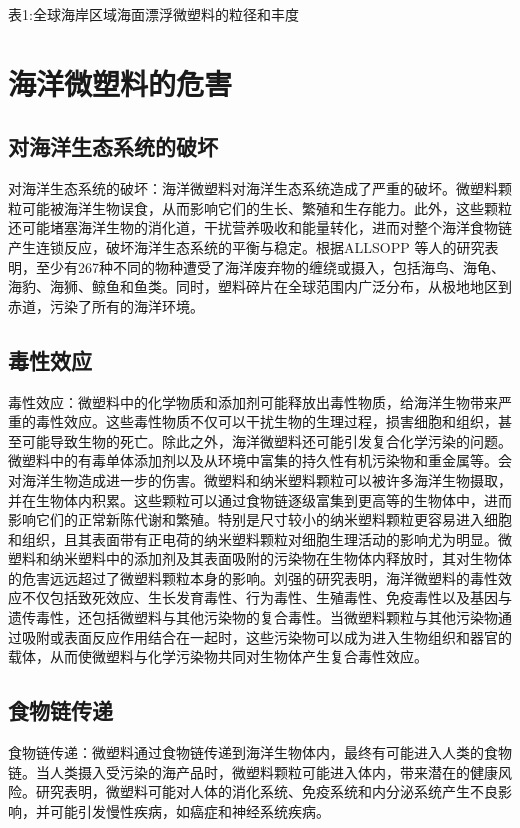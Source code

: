 \documentclass{article}
\begin{document}
      \begin{center}
          表1:\quad 全球海岸区域海面漂浮微塑料的粒径和丰度\cite{03}
      \end{center}  
      
        
    \section{海洋微塑料的危害}
    
    \subsection{对海洋生态系统的破坏}对海洋生态系统的破坏：海洋微塑料对海洋生态系统造成了严重的破坏。微塑料颗粒可能被海洋生物误食，从而影响它们的生长、繁殖和生存能力。此外，这些颗粒还可能堵塞海洋生物的消化道，干扰营养吸收和能量转化，进而对整个海洋食物链产生连锁反应，破坏海洋生态系统的平衡与稳定。根据ALLSOPP \cite{04}等人的研究表明，至少有267种不同的物种遭受了海洋废弃物的缠绕或摄入，包括海鸟、海龟、海豹、海狮、鲸鱼和鱼类。同时，塑料碎片在全球范围内广泛分布，从极地地区到赤道，污染了所有的海洋环境。
    
    \subsection{毒性效应} 毒性效应：微塑料中的化学物质和添加剂可能释放出毒性物质，给海洋生物带来严重的毒性效应。这些毒性物质不仅可以干扰生物的生理过程，损害细胞和组织，甚至可能导致生物的死亡。除此之外，海洋微塑料还可能引发复合化学污染的问题。微塑料中的有毒单体添加剂以及从环境中富集的持久性有机污染物和重金属等\cite{05}。会对海洋生物造成进一步的伤害。微塑料和纳米塑料颗粒可以被许多海洋生物摄取，并在生物体内积累。这些颗粒可以通过食物链逐级富集到更高等的生物体中，进而影响它们的正常新陈代谢和繁殖。特别是尺寸较小的纳米塑料颗粒更容易进入细胞和组织，且其表面带有正电荷的纳米塑料颗粒对细胞生理活动的影响尤为明显。微塑料和纳米塑料中的添加剂及其表面吸附的污染物在生物体内释放时，其对生物体的危害远远超过了微塑料颗粒本身的影响\cite{06}。刘强\cite{07}的研究表明，海洋微塑料的毒性效应不仅包括致死效应、生长发育毒性、行为毒性、生殖毒性、免疫毒性以及基因与遗传毒性，还包括微塑料与其他污染物的复合毒性。当微塑料颗粒与其他污染物通过吸附或表面反应作用结合在一起时，这些污染物可以成为进入生物组织和器官的载体，从而使微塑料与化学污染物共同对生物体产生复合毒性效应。
    
    \subsection{食物链传递} 食物链传递：微塑料通过食物链传递到海洋生物体内，最终有可能进入人类的食物链。当人类摄入受污染的海产品时，微塑料颗粒可能进入体内，带来潜在的健康风险。研究表明，微塑料可能对人体的消化系统、免疫系统和内分泌系统产生不良影响，并可能引发慢性疾病，如癌症和神经系统疾病。
    
\end{document}
